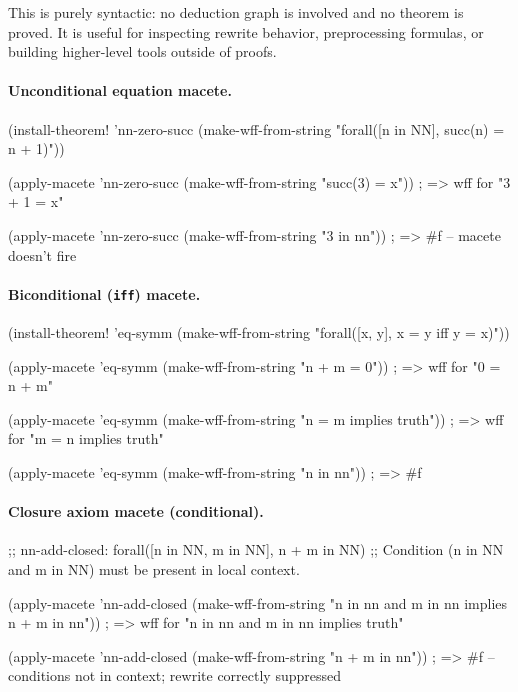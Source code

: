 This is purely syntactic: no deduction graph is involved and no
theorem is proved.  It is useful for inspecting rewrite behavior,
preprocessing formulas, or building higher-level tools outside of proofs.

\paragraph{Unconditional equation macete.}
\begin{VNBcode}
(install-theorem! 'nn-zero-succ
  (make-wff-from-string "forall([n in NN], succ(n) = n + 1)"))

(apply-macete 'nn-zero-succ (make-wff-from-string "succ(3) = x"))
; => wff for "3 + 1 = x"

(apply-macete 'nn-zero-succ (make-wff-from-string "3 in nn"))
; => #f               -- macete doesn't fire
\end{VNBcode}

\paragraph{Biconditional (\texttt{iff}) macete.}
\begin{VNBcode}
(install-theorem! 'eq-symm
  (make-wff-from-string "forall([x, y], x = y iff y = x)"))

(apply-macete 'eq-symm (make-wff-from-string "n + m = 0"))
; => wff for "0 = n + m"

(apply-macete 'eq-symm (make-wff-from-string "n = m implies truth"))
; => wff for "m = n implies truth"

(apply-macete 'eq-symm (make-wff-from-string "n in nn"))
; => #f
\end{VNBcode}

\paragraph{Closure axiom macete (conditional).}
\begin{VNBcode}
;; nn-add-closed: forall([n in NN, m in NN], n + m in NN)
;; Condition (n in NN and m in NN) must be present in local context.

(apply-macete 'nn-add-closed
  (make-wff-from-string "n in nn and m in nn implies n + m in nn"))
; => wff for "n in nn and m in nn implies truth"

(apply-macete 'nn-add-closed (make-wff-from-string "n + m in nn"))
; => #f  -- conditions not in context; rewrite correctly suppressed
\end{VNBcode}

